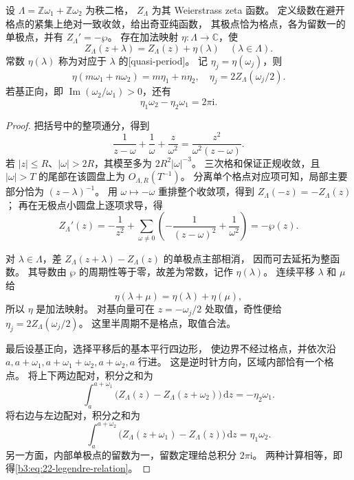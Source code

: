 \begin{proposition}\label{b3:prop:22-zeta-quasiperiods}
设 \(\Lambda=\mathbb Z\omega_1+\mathbb Z\omega_2\) 为秩二格，
\(Z_\Lambda\) 为其 Weierstrass zeta 函数。
定义级数在避开格点的紧集上绝对一致收敛，给出奇亚纯函数，
其极点恰为格点，各为留数一的单极点，并有 \(Z_\Lambda'=-\wp\)。
存在加法映射 \(\eta:\Lambda\to\mathbb C\)，使
\[
 Z_\Lambda(z+\lambda)=Z_\Lambda(z)+\eta(\lambda)
 \quad(\lambda\in\Lambda).
\]
常数 \(\eta(\lambda)\) 称为对应于 \(\lambda\) 的[quasi-period]。
记 \(\eta_j=\eta(\omega_j)\)，则
\[
 \eta(m\omega_1+n\omega_2)=m\eta_1+n\eta_2,\quad
 \eta_j=2Z_\Lambda(\omega_j/2).
\]
若基正向，即 \(\operatorname{Im}(\omega_2/\omega_1)>0\)，还有
\begin{equation}\label{b3:eq:22-legendre-relation}
 \eta_1\omega_2-\eta_2\omega_1=2\pi\mathrm i.
\end{equation}
\end{proposition}
\begin{proof}
把括号中的整项通分，得到
\[
 \frac1{z-\omega}+\frac1\omega+\frac z{\omega^2}
 =\frac{z^2}{\omega^2(z-\omega)}.
\]
若 \(|z|\le R\)、\(|\omega|>2R\)，其模至多为
\(2R^2|\omega|^{-3}\)。
三次格和保证正规收敛，且 \(|\omega|>T\) 的尾部在该圆盘上为
\(O_{\Lambda,R}(T^{-1})\)。
分离单个格点对应项可知，局部主要部分恰为 \((z-\lambda)^{-1}\)。
用 \(\omega\mapsto-\omega\) 重排整个收敛项，得到 \(Z_\Lambda(-z)=-Z_\Lambda(z)\)；
再在无极点小圆盘上逐项求导，得
\[
 Z_\Lambda'(z)
 =-\frac1{z^2}+\sum_{\omega\ne0}
     \left(-\frac1{(z-\omega)^2}+\frac1{\omega^2}\right)
 =-\wp(z).
\]

对 \(\lambda\in\Lambda\)，差
\(Z_\Lambda(z+\lambda)-Z_\Lambda(z)\) 的单极点主部相消，
因而可去延拓为整函数。
其导数由 \(\wp\) 的周期性等于零，故差为常数，记作 \(\eta(\lambda)\)。
连续平移 \(\lambda\) 和 \(\mu\) 给
\[
 \eta(\lambda+\mu)=\eta(\lambda)+\eta(\mu),
\]
所以 \(\eta\) 是加法映射。
对基向量可在 \(z=-\omega_j/2\) 处取值，奇性便给
\(\eta_j=2Z_\Lambda(\omega_j/2)\)。
这里半周期不是格点，取值合法。

最后设基正向，选择平移后的基本平行四边形，
使边界不经过格点，并依次沿
\(a,a+\omega_1,a+\omega_1+\omega_2,a+\omega_2,a\) 行进。
这是逆时针方向，区域内部恰有一个格点。
将上下两边配对，积分之和为
\[
 \int_a^{a+\omega_1}
     \bigl(Z_\Lambda(z)-Z_\Lambda(z+\omega_2)\bigr)\,\mathrm dz
 =-\eta_2\omega_1.
\]
将右边与左边配对，积分之和为
\[
 \int_a^{a+\omega_2}
     \bigl(Z_\Lambda(z+\omega_1)-Z_\Lambda(z)\bigr)\,\mathrm dz
 =\eta_1\omega_2.
\]
另一方面，内部单极点的留数为一，留数定理给总积分 \(2\pi\mathrm i\)。
两种计算相等，即得\eqref{b3:eq:22-legendre-relation}。
\end{proof}

